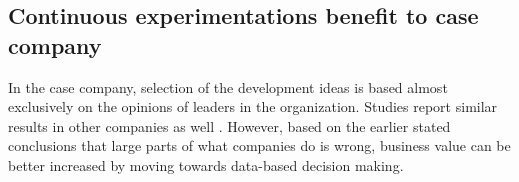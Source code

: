 \documentclass[english]{tktltiki2}
\theoremstyle{definition}
\theoremstyle{remark}
\begin{document}






\subsection{Continuous experimentations benefit to case company}



In the case company, selection of the development ideas is based almost exclusively on the opinions of leaders in the organization. Studies report similar results in other companies as well \cite{kohavi2007practical}. However, based on the earlier stated conclusions that large parts of what companies do is wrong, business value can be better increased by moving towards data-based decision making. 
\end{document}
